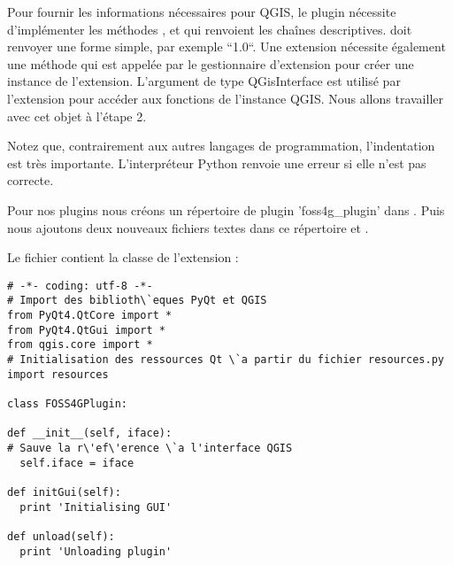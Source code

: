 Pour fournir les informations n\'ecessaires pour QGIS, le plugin n\'ecessite
d'impl\'ementer les m\'ethodes ,  et
 qui renvoient les cha\^ines descriptives.
 doit renvoyer une forme simple, par exemple
``1.0``. Une extension n\'ecessite \'egalement une m\'ethode
 qui est appel\'ee par le gestionnaire d'extension
 pour cr\'eer une instance de l'extension. L'argument de type QGisInterface est
utilis\'e par l'extension pour acc\'eder aux fonctions de l'instance QGIS. Nous allons
travailler avec cet objet \`a l'\'etape 2.

Notez que, contrairement aux autres langages de programmation, l'indentation est
tr\`es importante. L'interpr\'eteur Python renvoie une erreur si elle n'est pas
correcte.

Pour nos plugins nous  cr\'eons un r\'epertoire de plugin 'foss4g\_plugin' dans
. Puis nous ajoutons deux nouveaux
fichiers textes dans ce r\'epertoire  et
.

Le fichier  contient la classe de l'extension :

\begin{verbatim}
# -*- coding: utf-8 -*-
# Import des biblioth\`eques PyQt et QGIS
from PyQt4.QtCore import *
from PyQt4.QtGui import *
from qgis.core import *
# Initialisation des ressources Qt \`a partir du fichier resources.py
import resources

class FOSS4GPlugin:

def __init__(self, iface):
# Sauve la r\'ef\'erence \`a l'interface QGIS
  self.iface = iface

def initGui(self):
  print 'Initialising GUI'

def unload(self):
  print 'Unloading plugin'
\end{verbatim}


